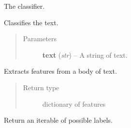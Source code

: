 \documentclass[letterpaper,10pt,english]{sphinxmanual}
\begin{document}
\begin{fulllineitems}
\begin{fulllineitems}
\label{api_reference:textblob.classifiers.NLTKClassifier.classifier}
The classifier.

\end{fulllineitems}


\begin{fulllineitems}
\label{api_reference:textblob.classifiers.NLTKClassifier.classify}
Classifies the text.
\begin{quote}\begin{description}
\item[{Parameters}] \leavevmode
\textbf{text} (\emph{str}) -- A string of text.

\end{description}\end{quote}

\end{fulllineitems}


\begin{fulllineitems}
\label{api_reference:textblob.classifiers.NLTKClassifier.extract_features}
Extracts features from a body of text.
\begin{quote}\begin{description}
\item[{Return type}] \leavevmode
dictionary of features

\end{description}\end{quote}

\end{fulllineitems}


\begin{fulllineitems}
\label{api_reference:textblob.classifiers.NLTKClassifier.labels}
Return an iterable of possible labels.

\end{fulllineitems}



\end{fulllineitems}
\end{document}
